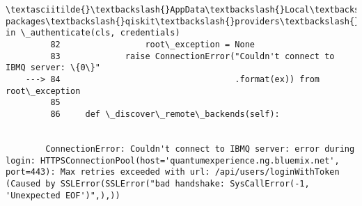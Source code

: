 \documentclass[11pt]{article}
\begin{document}
\begin{Verbatim}[commandchars=\\\{\}]
        \textasciitilde{}\textbackslash{}AppData\textbackslash{}Local\textbackslash{}Continuum\textbackslash{}anaconda3\textbackslash{}lib\textbackslash{}site-packages\textbackslash{}qiskit\textbackslash{}providers\textbackslash{}ibmq\textbackslash{}ibmqsingleprovider.py in \_authenticate(cls, credentials)
         82                 root\_exception = None
         83             raise ConnectionError("Couldn't connect to IBMQ server: \{0\}"
    ---> 84                                   .format(ex)) from root\_exception
         85 
         86     def \_discover\_remote\_backends(self):
    

        ConnectionError: Couldn't connect to IBMQ server: error during login: HTTPSConnectionPool(host='quantumexperience.ng.bluemix.net', port=443): Max retries exceeded with url: /api/users/loginWithToken (Caused by SSLError(SSLError("bad handshake: SysCallError(-1, 'Unexpected EOF')",),))

    \end{Verbatim}


    
    
    
    
\end{document}
